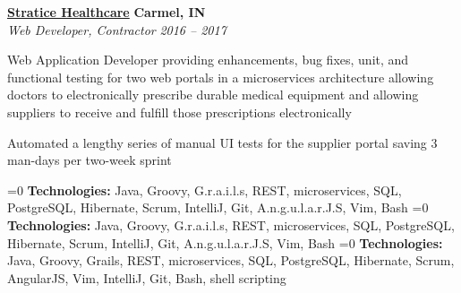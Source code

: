 %
    \headerrow
        {\textbf{\href{https://www.straticehealthcare.com/}{Stratice Healthcare}}}
        {\textbf{Carmel, IN}}
    \\
    \headerrow
        {\emph{Web Developer, Contractor}}
        {\emph{2016 -- 2017}}
    \begin{itemize*}
        \item Web Application Developer providing enhancements, bug fixes, unit, and functional testing for two
            web portals in a microservices architecture allowing doctors to electronically prescribe durable medical equipment and
            allowing suppliers to receive and fulfill those prescriptions electronically
        \item Automated a lengthy series of manual UI tests for the supplier portal saving 3 man-days per two-week sprint
    \end{itemize*}

    \ifnum{}=0
    \hspace{1.0em}
        {\textbf{Technologies:} Java, Groovy, G.r.a.i.l.s, REST, microservices, SQL, PostgreSQL, Hibernate, Scrum, IntelliJ, Git,
        A.n.g.u.l.a.r.J.S, Vim, Bash}
    \fi
    \ifnum{}=0
    \hspace{1.0em}
        {\textbf{Technologies:} Java, Groovy, G.r.a.i.l.s, REST, microservices, SQL, PostgreSQL, Hibernate, Scrum, IntelliJ, Git,
        A.n.g.u.l.a.r.J.S, Vim, Bash}
    \fi
    \ifnum{}=0
    \hspace{1.0em}
        {\textbf{Technologies:} Java, Groovy, Grails, REST, microservices, SQL, PostgreSQL, Hibernate, Scrum, AngularJS, Vim, IntelliJ, Git, Bash, shell scripting}
    \fi
